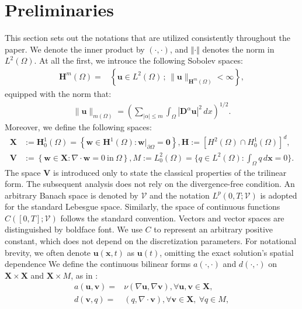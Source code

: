\documentclass[10pt]{article}
\begin{document}
	\section{Preliminaries}
	\setcounter{equation}{0}
	This section sets out the notations that are utilized consistently throughout the paper. We denote the inner product by $(\cdot, \cdot)$, and $\Vert \cdot \Vert$ denotes the norm in $L^2(\Omega)$. 	At all the first, we introuce the following Sobolev spaces:
	\begin{align*}
		\bm{H}^{m}(\Omega) = & \left\{ \bm{u} \in  L^2(\Omega) \, ; \, \|\bm{u}\|_{\bm{H}^{m}(\Omega)} < \infty \right\},
	\end{align*}
	equipped with the norm that:
	\begin{align*}
		\|\bm{u} \|_{m(\Omega)} =	\left( \sum_{|\alpha| \leq m} \displaystyle\int_\Omega \left| \bm{D}^\alpha \bm{u} \right|^2 \, dx \right)^{1/2}.
	\end{align*} 
	Moreover, we define the following spaces:
	\begin{align*}
	\bm{X} &:= \bm{H}_0^1(\Omega) = \left\{ \bm{w} \in \bm{H}^1(\Omega) : \left. \bm{w} \right|_{\partial \Omega} = \mathbf{0} \right\},{ \bm{H}:=[H^2(\Omega)\cap H_0^1(\Omega)]^d},\\
	\bm{V}&:= \left\{ \bm{w} \in \bm{X} : \nabla \cdot \bm{w} = 0 \ \text{in} \ \Omega \right\}, 
	M := L_0^2(\Omega) = \{ q \in L^2(\Omega) : \int_{\Omega} q \, d\mathbf{x} = 0 \}.
	\end{align*}
	{ The space $\bm{V}$ is introduced only to state the classical properties
	of the trilinear form. The subsequent analysis does not rely on the
	divergence-free condition.} An arbitrary Banach space is denoted by $\mathcal{V}$ and the notation $L^p(0, T; \mathcal{V})$ is adopted for the standard Lebesgue space. Similarly, the space of continuous functions $C([0, T]; \mathcal{V})$ follows the standard convention. Vectors and vector spaces are distinguished by boldface font. We use $C$ to represent an arbitrary positive constant, which does not depend on the discretization parameters.
	For notational brevity, we often denote $\bm{u}(\bm{x}, t)$ as $\bm{u}(t)$, omitting the exact solution’s spatial dependence
	We define the continuous bilinear forms $a(\cdotp,\cdotp)$ and $d(\cdotp,\cdotp)$ on $\bm{X} \times\bm{X}$ and $\bm{X}\times M$, as in\cite{M1989} :
	\begin{align*}
		a(\bm{u}, \bm{v}) = & \nu(\nabla \bm{u}, \nabla\bm {v}),   \forall \bm{u}, \bm{v }\in \bm{X}, \\
		d(\bm{v}, q) = & (q, \nabla \cdot \bm{v}),   \forall \bm{v} \in \bm{X}, \ \forall q \in M,
	\end{align*}
\end{document}
